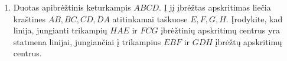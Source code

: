\begin{enumerate}
\item Duotas apibrėžtinis keturkampis $ABCD$. Į jį įbrėžtas
  apskritimas liečia kraštines $AB,BC,CD,DA$ atitinkamai
  taškuose $E,F,G,H$. Įrodykite, kad linija, jungianti
  trikampių $HAE$ ir $FCG$ įbrėžtinių apskritimų centrus yra
  statmena linijai, jungiančiai į trikampius $EBF$ ir $GDH$
  įbrėžtų apskritimų centrus.

\end{enumerate}
